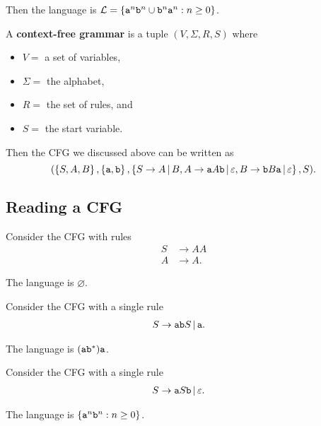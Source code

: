 \documentclass{notes}
\begin{document}
Then the language is $\mathcal L = \left \{ \verb~a~^n \verb~b~^n \cup \verb~b~^n \verb~a~^n : n \geq 0 \right \}$.

\begin{defn}
  A {\boldmath \bfseries context-free grammar} is a tuple $(V, \Sigma, R, S)$ where
  \begin{itemize}
    \item $V = $ a set of variables,  

    \item $\Sigma = $ the alphabet,  

    \item $R = $ the set of rules, and  

    \item $S = $ the start variable.
  \end{itemize}
\end{defn}

Then the CFG we discussed above can be written as 
\[
  (\left \{ S, A, B \right \}, \left \{ \verb~a~, \verb~b~ \right \}, \left \{ S \to A \, | \, B, A \to \verb~a~ A \verb~b~ \, | \, \varepsilon, B \to \verb~b~ B \verb~a~ \, | \, \varepsilon \right \}, S).
\]

\newpage

\subsection{Reading a CFG}

\begin{eg}
  Consider the CFG with rules
  \begin{align*}
    S &\to AA \\ 
    A &\to A.
  \end{align*}
  
  The language is $\varnothing$.
\end{eg}

\begin{eg}
  Consider the CFG with a single rule 
  \begin{align*}
    S &\to \verb~ab~ S \, | \, \verb~a~.
  \end{align*}
  
  The language is $(\verb~ab~^*) \verb~a~$.
\end{eg}

\begin{eg}
  Consider the CFG with a single rule 
  \begin{align*}
    S &\to \verb~a~ S \verb~b~ \, | \, \varepsilon.
  \end{align*}
  
  The language is $\left \{ \verb~a~^n \verb~b~^n : n \geq 0 \right \}$.
\end{eg}
\end{document}
